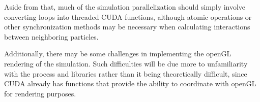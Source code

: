 \documentclass[cameraready]{acmsiggraph-awb}
\begin{document}
Aside from that, much of the simulation parallelization should simply involve converting loops into threaded CUDA functions, 
although atomic operations or other synchronization methods may be necessary when calculating interactions between neighboring particles.

Additionally, there may be some challenges in implementing the openGL rendering of the simulation.  
Such difficulties will be due more to unfamiliarity with the process and libraries rather than it being theoretically difficult, 
since CUDA already has functions that provide the ability to coordinate with openGL for rendering purposes.











%
%
\end{document}
